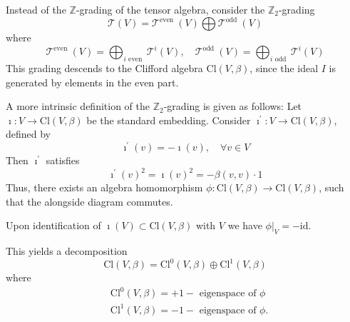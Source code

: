 \documentclass[10pt, letterpaper]{article}
\begin{document}
Instead of the $\mathbb{Z}$-grading of the tensor algebra, consider the $\mathbb{Z}_{2}$-grading
$$
\mathcal{T}(V)=\mathcal{T}^{\text {even }}(V) \bigoplus \mathcal{T}^{\text {odd }}(V)
$$
where
$$
\mathcal{T}^{\text {even }}(V)=\bigoplus_{i \text { even }} \mathcal{T}^{i}(V), \quad \mathcal{T}^{\text {odd }}(V)=\bigoplus_{i \text { odd }} \mathcal{T}^{i}(V)
$$
This grading descends to the Clifford algebra $\mathrm{Cl}(V, \beta)$, since the ideal $I$ is generated by elements in the even part.


A more intrinsic definition of the $\mathbb{Z}_{2}$-grading is given as follows: Let $\imath: V \rightarrow \mathrm{Cl}(V, \beta)$ be the standard embedding. Consider $\imath^{\prime}: V \rightarrow \mathrm{Cl}(V, \beta)$, defined by
$$
\imath^{\prime}(v)=-\imath(v), \quad \forall v \in V
$$
Then $\imath^{\prime}$ satisfies
$$
\imath^{\prime}(v)^{2}=\imath(v)^{2}=-\beta(v, v) \cdot 1
$$
Thus, there exists an algebra homomorphism $\phi: \mathrm{Cl}(V, \beta) \rightarrow \mathrm{Cl}(V, \beta)$, such that the alongside diagram commutes.

Upon identification of $\imath(V) \subset \mathrm{Cl}(V, \beta)$ with $V$ we have $\left.\phi\right|_{V}=-\mathrm{id}$.
This yields a decomposition
$$
\mathrm{Cl}(V, \beta)=\mathrm{Cl}^{0}(V, \beta) \oplus \mathrm{Cl}^{1}(V, \beta)
$$
where
$$
\begin{aligned}
& \mathrm{Cl}^{0}(V, \beta)=+1-\text { eigenspace of } \phi \\
& \mathrm{Cl}^{1}(V, \beta)=-1-\text { eigenspace of } \phi .
\end{aligned}
$$
\end{document}
